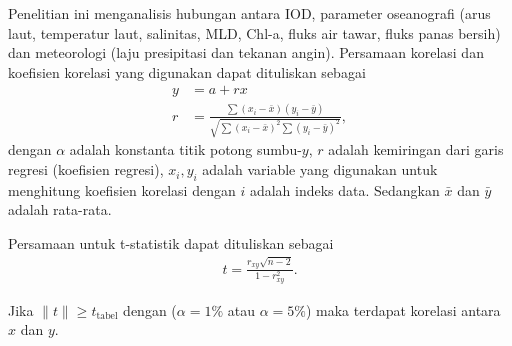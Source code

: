 \begin{spacing}{1.5}
		Penelitian ini menganalisis hubungan antara IOD, parameter oseanografi (arus laut, temperatur laut, salinitas, MLD, Chl-a, fluks air tawar, fluks panas bersih) dan meteorologi (laju presipitasi dan tekanan angin). Persamaan korelasi dan koefisien korelasi yang digunakan dapat dituliskan sebagai \cite{hidayat2023relationship,Haditiar2020}
		\begin{equation}
			\begin{aligned}
				y &= a+rx\\
				r &= \frac{\sum (x_i - \bar{x})(y_i - \bar{y})}{\sqrt{\sum (x_i-\bar{x})^2\sum (y_i-\bar{y})^2}},
			\end{aligned}
		\end{equation}
		dengan $\alpha$ adalah konstanta titik potong sumbu-$y$, $r$ adalah kemiringan dari garis regresi (koefisien regresi), $x_i, y_i$ adalah variable yang digunakan untuk menghitung koefisien korelasi dengan $i$ adalah indeks data. Sedangkan $\bar{x}$ dan $\bar{y}$ adalah rata-rata. 
		
		Persamaan untuk t-statistik dapat dituliskan sebagai
		\begin{equation}
			\begin{aligned}
				t=\frac{r_{xy}\sqrt{n-2}}{1-r^2_{xy}}.
			\end{aligned}
		\end{equation}

		Jika $\|t\|\geq t_{\text{tabel}}$ dengan ($\alpha=1\%$ atau $\alpha=5\%$) maka terdapat korelasi antara $x$ dan $y$.
\end{spacing}
\vspace{-0.5pc}

